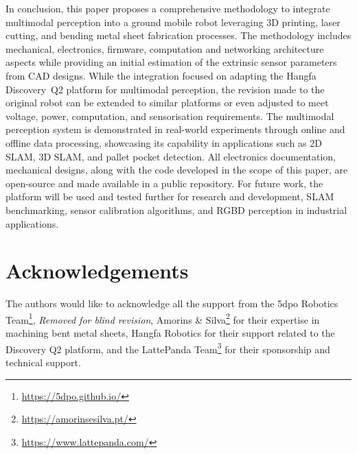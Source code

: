 \documentclass[letterpaper,10pt,conference]{IEEEtran} %
\def\finalversion{}
\begin{document}
%
%

In conclusion, this paper proposes a comprehensive methodology to
integrate multimodal perception into a ground mobile robot
leveraging 3D printing, laser cutting, and bending metal sheet
fabrication processes. The methodology includes mechanical, electronics,
firmware, computation and networking architecture aspects while
providing an initial estimation of the extrinsic sensor parameters
from CAD designs. While the integration focused on adapting the
Hangfa Discovery~Q2 platform for multimodal perception, the revision made
to the original robot can be extended to similar platforms or even adjusted
to meet voltage, power, computation, and sensorisation requirements.
The multimodal perception system is demonstrated in real-world experiments
through online and offline data processing, showcasing its capability in
applications such as 2D SLAM, 3D SLAM, and pallet pocket detection.
All electronics documentation, mechanical designs,
along with the code developed in the scope of this paper,
are open-source and made available in a public repository.
For future work, the platform will be used and tested further for research and
development, SLAM benchmarking, sensor calibration algorithms,
and RGBD perception in industrial applications.








\section*{Acknowledgements}\label{sec:acknowledge}

The authors would like to acknowledge all the support from the
\ifdefined\finalversion%
5dpo Robotics Team\footnote{\url{https://5dpo.github.io/}},
\else%
\textit{Removed for blind revision},
\fi%
Amorins \& Silva\footnote{\url{https://amorinsesilva.pt/}}
for their expertise in machining bent metal sheets,
Hangfa Robotics
for their support related to the Discovery Q2 platform,
and the LattePanda Team\footnote{\url{https://www.lattepanda.com/}}
for their sponsorship and technical support.
\end{document}
